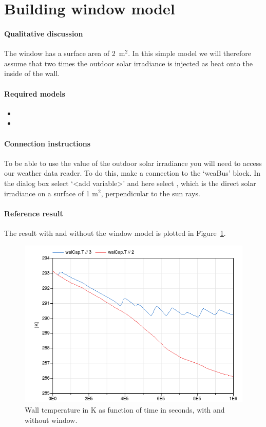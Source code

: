 \documentclass[10pt,a4paper]{article}
\begin{document}
\section{Building window model}
\paragraph{Qualitative discussion}
The window has a surface area of 2~m$^2$. 
In this simple model we will therefore assume that two times the
outdoor solar irradiance is injected as heat onto the inside of the wall.

\paragraph{Required models}
\begin{itemize}
\item {}
\item {}
\end{itemize}

\paragraph{Connection instructions}
To be able to use the value of the outdoor solar irradiance
you will need to access our weather data reader.
To do this, make a connection to the `weaBus' block. 
In the dialog box select `\textless add variable\textgreater' and here
select , 
which is the direct solar irradiance on a surface
of 1 m$^2$, perpendicular to the sun rays. 

\paragraph{Reference result}
The result with and without the window model
is plotted in Figure~\ref{fig:res2}.

\begin{figure}
\centering
\includegraphics[scale=0.6]{result2.png}
\caption{Wall temperature in K as function of time in seconds,
with and without window.}
\label{fig:res2}
\end{figure}
\end{document}
